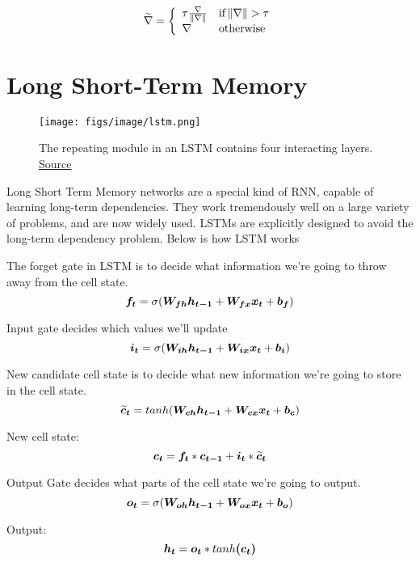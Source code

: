 \[
\widetilde{\nabla}=\left\{
            \begin{array}{ll}
              \tau\frac{\nabla}{\norm{\nabla}} & \text{if}  \norm{\nabla}>\tau\\
              \nabla & \text{otherwise}
            \end{array}
          \right.
\]

\section{Long Short-Term Memory}
\label{sec:long-short-term-memory}


\begin{figure}[h]
  \centering
      \texttt{[image: figs/image/lstm.png]}
          \caption{
            The repeating module in an LSTM contains four interacting layers.
            \href{http://colah.github.io/posts/2015-08-Understanding-LSTMs/}{Source}
          }
          \label{fig:lstm}
\end{figure}

Long Short Term Memory networks \cite{article-lstm} are a special kind of RNN, capable of learning long-term dependencies. 
They work tremendously well on a large variety of problems, and are now widely used.
LSTMs are explicitly designed to avoid the long-term dependency problem. 
Below is how LSTM works

The forget gate in LSTM is to decide what information we’re going to throw away from the cell state.
\[\vect{f_t} = \sigma(\matr{W_{fh}}\vect{h_{t-1}}+\matr{W_{fx}}\vect{x_t} + \vect{b_f}) \]

Input gate decides which values we’ll update
\[\vect{i_t} = \sigma(\matr{W_{ih}}\vect{h_{t-1}} + \matr{W_{ix}}\vect{x_t} + \vect{b_i})\]

New candidate cell state is to decide what new information we’re going to store in the cell state.
\[\vect{\widetilde{c}_t} = tanh(\matr{W_{ch}}\vect{h_{t-1}} + \matr{W_{cx}}\vect{x_t} + \vect{b_c})\]

New cell state:
\[\vect{c_t} = \vect{f_t}*\vect{c_{t-1}} + \vect{i_t}*\vect{\widetilde{c}_t}\]

Output Gate decides what parts of the cell state we’re going to output.
\[\vect{o_t} = \sigma(\matr{W_{oh}}\vect{h_{t-1}} + \matr{W_{ox}}\vect{x_t} + \vect{b_o})\]

Output:
\[\vect{h_t} = \vect{o_t}*tanh\vect{(c_t)}\]

